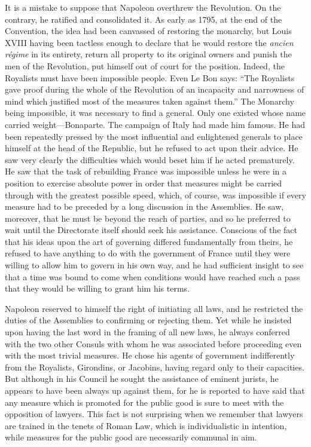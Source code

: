 \documentclass{book}
\begin{document}
It is a mistake to suppose that Napoleon overthrew the Revolution. On the contrary, he ratified and consolidated it. As early as 1795, at the end of the Convention, the idea had been canvassed of restoring the monarchy, but Louis XVIII having been tactless enough to declare that he would restore the \emph{ancien régime} in its entirety, return all property to its original owners and punish the men of the Revolution, put himself out of court for the position. Indeed, the Royalists must have been impossible people. Even Le Bon says: “The Royalists gave proof during the whole of the Revolution of an incapacity and narrowness of mind which justified most of the measures taken against them.” The Monarchy being impossible, it was necessary to find a general. Only one existed whose name carried weight—Bonaparte. The campaign of Italy had made him famous. He had been repeatedly pressed by the most influential and enlightened generals to place himself at the head of the Republic, but he refused to act upon their advice. He saw very clearly the difficulties which would beset him if he acted prematurely. He saw that the task of rebuilding France was impossible unless he were in a position to exercise absolute power in order that measures might be carried through with the greatest possible speed, which, of course, was impossible if every measure had to be preceded by a long discussion in the Assemblies. He saw, moreover, that he must be beyond the reach of parties, and so he preferred to wait until the Directorate itself should seek his assistance. Conscious of the fact that his ideas upon the art of governing differed fundamentally from theirs, he refused to have anything to do with the government of France until they were willing to allow him to govern in his own way, and he had sufficient insight to see that a time was bound to come when conditions would have reached such a pass that they would be willing to grant him his terms.

Napoleon reserved to himself the right of initiating all laws, and he restricted the duties of the Assemblies to confirming or rejecting them. Yet while he insisted upon having the last word in the framing of all new laws, he always conferred with the two other Consuls with whom he was associated before proceeding even with the most trivial measures. He chose his agents of government indifferently from the Royalists, Girondins, or Jacobins, having regard only to their capacities. But although in his Council he sought the assistance of eminent jurists, he appears to have been always up against them, for he is reported to have said that any measure which is promoted for the public good is sure to meet with the opposition of lawyers. This fact is not surprising when we remember that lawyers are trained in the tenets of Roman Law, which is individualistic in intention, while measures for the public good are necessarily communal in aim.
\end{document}
